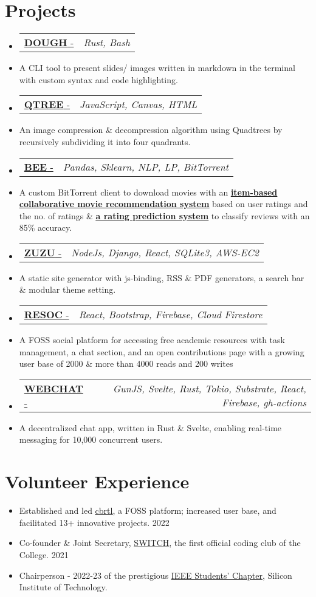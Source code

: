 \documentclass[letterpaper,11pt]{article}
\makeatletter
\newcommand{\resumeItem}[1]{
  \item\small{
    {#1 \vspace{-2pt}}
  }
}
\newcommand{\resumeProjectHeading}[2]{
    \item
    \begin{tabular*}{0.97\textwidth}{l@{\extracolsep{\fill}}r}
      \small#1 & \textit{\small #2} \\
    \end{tabular*}\vspace{-4 pt}
}
\newcommand{\resumeSubItem}[1]{\resumeItem{#1}\vspace{-4pt}}
\newcommand{\resumeSubHeadingListStart}{\begin{itemize}[leftmargin=0.15in, label={}]}
\newcommand{\resumeSubHeadingListEnd}{\end{itemize}}
\makeatother
\begin{document}
\section{Projects}
  \resumeSubHeadingListStart
  \resumeProjectHeading
    {\href{https://github.com/fuzzymfx/dough}{\textbf{DOUGH} - \faIcon{link}}}{Rust, Bash}
    \resumeSubItem
      {A CLI tool to present slides/ images written in markdown in the terminal with custom syntax and code highlighting.}
    \resumeProjectHeading
    {\href{https://anubhavp.dev/blog/qtree.html}{\textbf{QTREE} - \faIcon{link}}}{JavaScript, Canvas, HTML}
    \resumeSubItem
      {An image compression \& decompression algorithm using Quadtrees by recursively subdividing it into four quadrants. }
      \resumeProjectHeading
    {\href{https://github.com/fuzzymfx/b}{{\textbf{BEE} - \faIcon{link} }}}{Pandas, Sklearn, NLP, LP, BitTorrent}
    \resumeSubItem
      {A custom BitTorrent client to download movies with an \href{https://github.com/fuzzymfx/Movie-recommendation}{\underline{\textbf{item-based collaborative movie recommendation system}}} based on user ratings and the no. of ratings \& \href{https://github.com/fuzzymfx/Movie-rating-prediction}{\underline{\textbf{a rating prediction system}}} to classify reviews with an 85\% accuracy.}
      \resumeProjectHeading
    {\href{https://github.com/fuzzymfx/zuzu}{\textbf{ZUZU} - \faIcon{link}}}{NodeJs, Django, React, SQLite3, AWS-EC2}
    \resumeSubItem
      {A static site generator with js-binding, RSS \& PDF generators, a search bar \& modular theme setting.}
      \resumeProjectHeading
    {\href{https://github.com/fuzzymfx/resoc}{\textbf{RESOC} - \faIcon{link} }}{React, Bootstrap, Firebase, Cloud Firestore}
    \resumeSubItem
      {A FOSS social platform for accessing free academic resources with task management, a chat section, and an open contributions page with a growing user base of 2000 \& more than 4000 reads and 200 writes}
    \resumeProjectHeading
    {\href{https://github.com/fuzzymfx/w3bchat-dapp}{\textbf{WEBCHAT} - \faIcon{link}}}{GunJS, Svelte, Rust, Tokio, Substrate, React, Firebase, gh-actions}
    \resumeSubItem
      {A decentralized chat app, written in Rust \& Svelte, enabling real-time messaging for 10,000 concurrent users. }
  \resumeSubHeadingListEnd

%

\section{Volunteer Experience}
  \resumeSubHeadingListStart
    \resumeSubItem
    {Established and led \href{https://cbrtl.github.io}{\underline{cbrtl}}, a FOSS platform; increased user base, and facilitated 13+ innovative projects. 2022}
    \resumeSubItem
      {Co-founder \& Joint Secretary, \href{https://www.linkedin.com/company/switch-sit/}{\underline{SWITCH}}, the first official coding club of the College. 2021}
    \resumeSubItem
      {Chairperson - 2022-23 of the prestigious \href{https://www.instagram.com/ieeesitbbsr/}{\underline{IEEE Students’ Chapter}}, Silicon Institute of Technology.}
  \resumeSubHeadingListEnd
\end{document}
